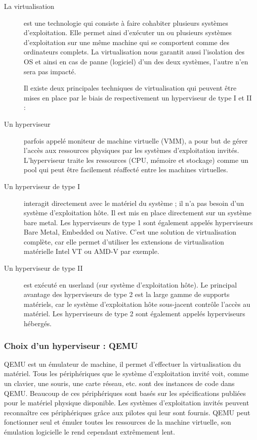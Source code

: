 \begin{description}
    \item[La virtualisation] est une technologie qui consiste à faire cohabiter plusieurs systèmes d'exploitation.
    Elle permet ainsi d'exécuter un ou plusieurs systèmes d'exploitation sur une même machine qui se comportent comme des ordinateurs complets.
    La virtualisation nous garantit aussi l'isolation des OS et ainsi en cas de panne (logiciel) d'un des deux systèmes, l’autre n’en sera pas impacté.

    Il existe deux principales techniques de virtualisation qui peuvent être mises en place par le biais de respectivement un hyperviseur de type I et II :

    \item[Un hyperviseur] parfois appelé moniteur de machine virtuelle (VMM), a pour but de gérer l’accès aux ressources physiques par les systèmes d’exploitation invités.
    L'hyperviseur traite les ressources (CPU, mémoire et stockage) comme un pool qui peut être facilement réaffecté entre les machines virtuelles.

    \item[Un hyperviseur de type I] interagit directement avec le matériel du système ; il n'a pas besoin d'un système d'exploitation hôte.
    Il est mis en place directement sur un système bare metal.
    Les hyperviseurs de type 1 sont également appelés hyperviseurs Bare Metal, Embedded ou Native.\cite{kvmbook}
    C'est une solution de virtualisation complète, car elle permet d'utiliser les extensions de virtualisation matérielle Intel VT ou AMD-V par exemple.


    \item[Un hyperviseur de type II] est exécuté en userland (sur système d'exploitation hôte).
    Le principal avantage des hyperviseurs de type 2 est la large gamme de supports matériels, car le système d'exploitation hôte sous-jacent contrôle l'accès au matériel.
    Les hyperviseurs de type 2 sont également appelés hyperviseurs hébergés. \cite{kvmbook}
    \end{description}



\subsubsection{Choix d'un hyperviseur : QEMU}
QEMU est un émulateur de machine, il permet d'effectuer la virtualisation du matériel.
Tous les périphériques que le système d'exploitation invité voit, comme un clavier, une souris, une carte réseau, etc. sont des instances de code dans QEMU.
Beaucoup de ces périphériques sont basés sur les spécifications publiées pour le matériel physique disponible.
Les systèmes d'exploitation invités peuvent reconnaître ces périphériques grâce aux pilotes qui leur sont fournis.
QEMU peut fonctionner seul et émuler toutes les ressources de la machine virtuelle, son émulation logicielle le rend cependant extrêmement lent.

